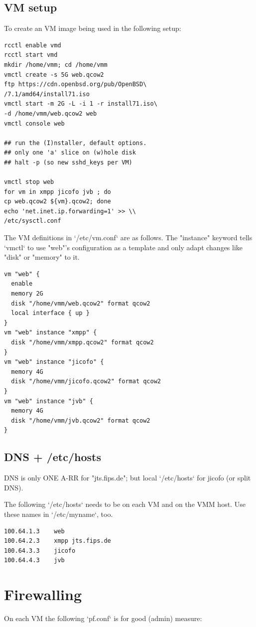 \documentclass[10pt,conference]{IEEEtran}
\begin{document}
\subsection{VM setup}
To create an VM image being used in the following setup:
\begin{verbatim}
rcctl enable vmd
rcctl start vmd
mkdir /home/vmm; cd /home/vmm
vmctl create -s 5G web.qcow2
ftp https://cdn.openbsd.org/pub/OpenBSD\
/7.1/amd64/install71.iso
vmctl start -m 2G -L -i 1 -r install71.iso\
-d /home/vmm/web.qcow2 web
vmctl console web

## run the (I)nstaller, default options.
## only one 'a' slice on (w)hole disk
## halt -p (so new sshd_keys per VM)

vmctl stop web
for vm in xmpp jicofo jvb ; do
cp web.qcow2 ${vm}.qcow2; done
echo 'net.inet.ip.forwarding=1' >> \\
/etc/sysctl.conf
\end{verbatim}

The VM definitions in `/etc/vm.conf` are as follows. The "instance" keyword tells `vmctl`
to use "web"'s configuration as a template and only adapt changes like "disk"
or "memory" to it.

\begin{verbatim}
vm "web" {
  enable
  memory 2G
  disk "/home/vmm/web.qcow2" format qcow2
  local interface { up }
}
vm "web" instance "xmpp" {
  disk "/home/vmm/xmpp.qcow2" format qcow2
}
vm "web" instance "jicofo" {
  memory 4G
  disk "/home/vmm/jicofo.qcow2" format qcow2
}
vm "web" instance "jvb" {
  memory 4G
  disk "/home/vmm/jvb.qcow2" format qcow2
}
\end{verbatim}

\subsection{DNS + /etc/hosts}
DNS is only ONE A-RR for "jts.fips.de"; but local `/etc/hosts` for jicofo (or split DNS).

The following `/etc/hosts` needs to be on each VM and on the VMM host.
Use these names in `/etc/myname`, too.

\begin{verbatim}
100.64.1.3    web
100.64.2.3    xmpp jts.fips.de
100.64.3.3    jicofo
100.64.4.3    jvb
\end{verbatim}

\section{Firewalling}
On each VM the following `pf.conf` is for good (admin) measure:
\end{document}
